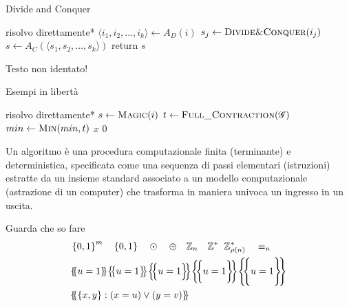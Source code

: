 \begin{algorithm}[H]
\caption{Divide and Conquer}\label{alg:dnc}
\begin{algorithmic}[1]
            \State *risolvo direttamente*
        \EndIf
        \State $\langle i_1, i_2, \dots, i_k \rangle \gets A_D(i)$ 
            \State $s_j \gets
            \Call{Divide\&Conquer}{i_j}
            $
        \EndFor
        \State $s \gets A_C(\langle s_1, s_2, \dots, s_k \rangle)$
        \State return $s$
    \EndProcedure
\end{algorithmic}
\end{algorithm}
\noindent
Testo non identato!
\begin{algorithm}[H]
\caption{Esempi in libertà}\label{alg:esempi}
\begin{algorithmic}[1]
            \State *risolvo direttamente*
        \EndIf
            \State $s \gets
            \Call{Magic}{i}
            $
        \EndFor
            \State $t \gets \Call{Full\_Contraction}{\bgg{}} $
            \State $min \gets \Call{Min}{min, t} $
        \EndRepLoop
        \State \Return $x$
    \EndProcedure
        \State \Return $0$
    \EndFunction
\end{algorithmic}
\end{algorithm}

\begin{definition}[Algoritmo]\label{def:algex}
    Un algoritmo è una procedura computazionale finita (terminante) e deterministica, specificata come una sequenza di passi elementari (istruzioni) estratte da un insieme standard associato a un modello computazionale (astrazione di un computer) che trasforma in maniera univoca un ingresso in un uscita.
\end{definition}

Guarda che so fare
\begin{align*}
    &
    \setzo{m}
    \quad
    \setzo{}
    \quad
    \odot
    \quad
    \oplus
    \quad
    \zz{n}
    \quad
    \zs
    \quad
    \zs{\rho(n)}
    \quad
    \equiv_n
    \\
    &
    \ldblbrace
        u = 1
    \rdblbrace
    \ldblbraceb
        u = 1
    \rdblbraceb
    \ldblbraceB
        u = 1
    \rdblbraceB
    \ldblbracebb
        u = 1
    \rdblbracebb
    \ldblbraceBB
        u = 1
    \rdblbraceBB
    \\
    &
    \ldblbrace
        \left\{ x, y \right\}
        :
        \left( x = u \right)
        \vee
        \left( y = v \right)
    \rdblbrace
\end{align*}

